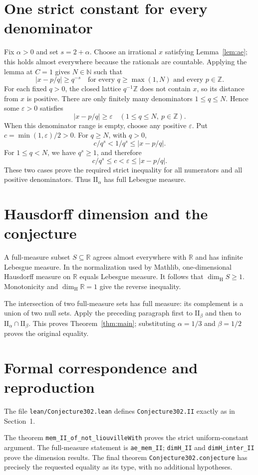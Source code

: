 \documentclass[10pt]{article}
\newcommand{\II}{\mathrm{II}}
\newcommand{\R}{\mathbb R}
\newcommand{\Z}{\mathbb Z}
\newcommand{\N}{\mathbb N}
\newcommand{\dimH}{\dim_{\mathrm H}}
\begin{document}
\section{One strict constant for every denominator}
Fix $\alpha>0$ and set $s=2+\alpha$. Choose an irrational $x$ satisfying Lemma~\ref{lem:ae}; this holds almost everywhere because the rationals are countable. Applying the lemma at $C=1$ gives $N\in\N$ such that
\[
 |x-p/q|\ge q^{-s}\quad\text{for every }q\ge\max(1,N)
 \text{ and every }p\in\Z.
\]
For each fixed $q>0$, the closed lattice $q^{-1}\Z$ does not contain $x$, so its distance from $x$ is positive. There are only finitely many denominators $1\le q\le N$. Hence some $\varepsilon>0$ satisfies
\[
 |x-p/q|\ge\varepsilon\quad(1\le q\le N,\ p\in\Z).
\]
When this denominator range is empty, choose any positive $\varepsilon$. Put $c=\min(1,\varepsilon)/2>0$. For $q\ge N$, with $q>0$,
\[
 c/q^s<1/q^s\le|x-p/q|.
\]
For $1\le q<N$, we have $q^s\ge1$, and therefore
\[
 c/q^s\le c<\varepsilon\le|x-p/q|.
\]
These two cases prove the required strict inequality for all numerators and all positive denominators. Thus $\II_\alpha$ has full Lebesgue measure.

\section{Hausdorff dimension and the conjecture}
A full-measure subset $S\subseteq\R$ agrees almost everywhere with $\R$ and has infinite Lebesgue measure. In the normalization used by Mathlib, one-dimensional Hausdorff measure on $\R$ equals Lebesgue measure. It follows that $\dimH S\ge1$. Monotonicity and $\dimH\R=1$ give the reverse inequality.

The intersection of two full-measure sets has full measure: its complement is a union of two null sets. Apply the preceding paragraph first to $\II_\beta$ and then to $\II_\alpha\cap\II_\beta$. This proves Theorem~\ref{thm:main}; substituting $\alpha=1/3$ and $\beta=1/2$ proves the original equality.

\section{Formal correspondence and reproduction}
The file \texttt{lean/Conjecture302.lean} defines \texttt{Conjecture302.II} exactly as in Section~1. 

The theorem \texttt{mem\_II\_of\_not\_liouvilleWith} proves the strict uniform-constant argument. The full-measure statement is \texttt{ae\_mem\_II}; \texttt{dimH\_II} and \texttt{dimH\_inter\_II} prove the dimension results. The final theorem \texttt{Conjecture302.conjecture} has precisely the requested equality as its type, with no additional hypotheses.
\end{document}

